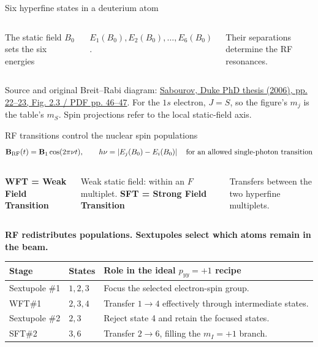 \documentclass[12pt,a4paper]{article}
\newcommand{\src}[2]{\href{#1}{#2}}
\newcommand{\hyperfineref}{https://nucldata.tunl.duke.edu/nucldata/Theses/PhD/Sabourov_2006.pdf}
\newcommand{\smalltext}{\fontsize{17}{22}\selectfont}
\newcommand{\source}[1]{\vfill{\color{Muted}\fontsize{10}{13}\selectfont #1\par}}
\newcommand{\lead}[1]{{\color{Teal}\bfseries #1\par}\vspace{3mm}}
\renewcommand{\arraystretch}{1.35}
\begin{document}
\begin{frame}[t]{Six hyperfine states in a deuterium atom}
\begin{columns}[T,onlytextwidth]
\smalltext
The static field $B_0$ sets the six energies\par
\vspace{1mm}
$E_1(B_0),E_2(B_0),\ldots,E_6(B_0)$.\par
\vspace{2mm}
Their separations determine the RF resonances.
\end{columns}
\source{Source and original Breit--Rabi diagram: \src{\hyperfineref}{Sabourov, Duke PhD thesis (2006), pp. 22--23, Fig. 2.3 / PDF pp. 46--47}. For the $1s$ electron, $J=S$, so the figure's $m_j$ is the table's $m_S$. Spin projections refer to the local static-field axis.}
\note{\noteone}
\end{frame}

\begin{frame}[t]{RF transitions control the nuclear spin populations}
\smalltext
\setlength{\abovedisplayskip}{3pt}
\setlength{\belowdisplayskip}{6pt}
\vspace{-2mm}
\[
 \mathbf B_{\rm RF}(t)=\mathbf B_1\cos(2\pi\nu t),\qquad
 h\nu=\left|E_j(B_0)-E_i(B_0)\right|
 \quad\text{for an allowed single-photon transition}
\]
\vspace{-2mm}
\begin{columns}[T,onlytextwidth]
\textbf{WFT = Weak Field Transition}\par
Weak static field: within an $F$ multiplet.
\textbf{SFT = Strong Field Transition}\par
Transfers between the two hyperfine multiplets.
\end{columns}
\vspace{3mm}
\lead{RF redistributes populations. Sextupoles select which atoms remain in the beam.}
\renewcommand{\arraystretch}{1.12}
\begin{tabularx}{\textwidth}{@{}p{43mm}p{37mm}Y@{}}
\toprule
Stage & States & Role in the ideal $p_{yy}=+1$ recipe\\
\midrule
Sextupole \#1 & $1,2,3$ & Focus the selected electron-spin group.\\
WFT\#1 & $2,3,4$ & Transfer $1\to4$ effectively through intermediate states.\\
Sextupole \#2 & $2,3$ & Reject state 4 and retain the focused states.\\
SFT\#2 & $3,6$ & Transfer $2\to6$, filling the $m_I=+1$ branch.\\
\bottomrule
\end{tabularx}\par
\vspace{2mm}

\end{frame}
\end{document}
